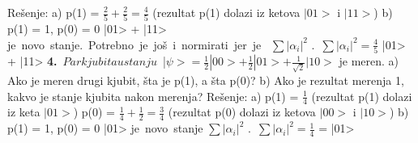 \documentclass{article}
\begin{document}
Rešenje: \vspace{0.2cm}\newline
a) p(1) = $\frac{2}{5} + \frac{2}{5} = \frac{4}{5}$ (rezultat p(1) dolazi iz ketova $|01>$ i $|11>$) \newline 
b) p(1) = 1, p(0) = 0 \newline
\hspace*{0.4cm}\Rightarrow {}|01> + |11> je\ novo\ stanje.\ Potrebno\ je\ još\ i\ normirati\ jer\ je\ \newline
\hspace*{0.4cm}$\sum|\alpha_i|^2$ .\ $\sum|\alpha_i|^2 = \frac{4}{5}$ \Rightarrow
{}|01> + |11>
\vspace{0.4cm}\newline
\textbf{4.}\ $Par kjubita u stanju$\ |$\psi> = \frac{1}{2}|00> + \frac{1}{2}|01> + \frac{1}{\sqrt{2}}|10>$ je meren. \newline
a) Ako je meren drugi kjubit, šta je p(1), a šta p(0)?\newline
b) Ako je rezultat merenja 1, kakvo je stanje kjubita nakon merenja?
\vspace*{0.4cm}\newline
Rešenje: \vspace{0.2cm}\newline
a) p(1) = $\frac{1}{4}$ (rezultat p(1) dolazi iz keta $|01>$)\newline
\hspace*{0.4cm}p(0) = $\frac{1}{4} + \frac{1}{2} = \frac{3}{4}$ (rezultat p(0) dolazi iz ketova $|00>$ i $|10>$)\newline 
b) p(1) = 1, p(0) = 0 \newline
\hspace*{0.4cm}\Rightarrow {}|01> je\ novo\ stanje \Rightarrow $\sum|\alpha_i|^2$ .\ $\sum|\alpha_i|^2 = \frac{1}{4}$ \Rightarrow {} =  \Rightarrow |01>
\newpage
\end{document}

